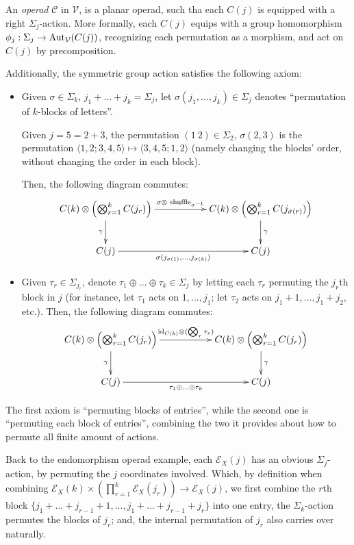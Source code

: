 \documentclass{article}
\begin{document}
\begin{defn}
    An \emph{operad} $\mathcal{C}$ in $\mathcal{V}$, is a planar operad, such tha each $C(j)$ is equipped with a right $\Sigma_j$-action. More formally, each $C(j)$ equips with a group homomorphism $\phi_j:\Sigma_j\rightarrow \mathrm{Aut}_\mathcal{V}(C(j))$, recognizing each permutation as a morphism, and act on $C(j)$ by precomposition.

    Additionally, the symmetric group action satisfies the following axiom:
    \begin{itemize}
        \item Given $\sigma\in\Sigma_k$, $j_1+...+j_k = \Sigma_j$, let $\sigma(j_1,...,j_k)\in\Sigma_j$ denotes ``permutation of $k$-blocks of letters''.
        \begin{exmp}
            Given $j=5=2+3$, the permutation $(1\ 2)\in \Sigma_2$, $\sigma(2,3)$ is the permutation $\langle 1,2;3,4,5 \rangle \mapsto \langle 3,4,5;1,2\rangle$ (namely changing the blocks' order, without changing the order in each block).
        \end{exmp} 
        Then, the following diagram commutes:
        \[\xymatrix{
            C(k)\tensor \left(\bigtensor_{r=1}^k C(j_r)\right) \ar[d]_-{\gamma} \ar[rr]^-{\sigma\tensor \text{ shuffle}_{\sigma^{-1}}} && C(k)\tensor \left(\bigtensor_{r=1}^k C(j_{\sigma(r)})\right) \ar[d]^-{\gamma}\\
            C(j) \ar[rr]_-{\sigma(j_{\sigma(1)},...,j_{\sigma(k)})} && C(j)
        }\]
        \item Given $\tau_r\in \Sigma_{j_r}$, denote $\tau_1\oplus ... \oplus \tau_k\in \Sigma_j$ by letting each $\tau_r$ permuting the $j_r$th block in $j$ (for instance, let $\tau_1$ acts on $1,...,j_1$; let $\tau_2$ acts on $j_1+1,...,j_1+j_2$, etc.). Then, the following diagram commutes:
        \[\xymatrix{
            C(k)\tensor \left(\bigtensor_{r=1}^k C(j_r)\right)\ar[d]_-{\gamma} \ar[rr]^-{\id_{C(k)}\tensor (\bigtensor_r \tau_r)} && C(k)\tensor \left(\bigtensor_{r=1}^k C(j_r)\right) \ar[d]^-{\gamma}\\
            C(j) \ar[rr]_{\tau_1\oplus...\oplus\tau_k} && C(j)
        }\]
    \end{itemize}
\end{defn}

The first axiom is ``permuting blocks of entries'', while the second one is ``permuting each block of entries'', combining the two it provides about how to permute all finite amount of actions.

\begin{exmp}
    Back to the endomorphism operad example, each $\mathcal{E}_X (j)$ has an obvious $\Sigma_j$-action, by permuting the $j$ coordinates involved. Which, by definition when combining $\mathcal{E}_X(k)\times \left(\prod_{r=1}^k \mathcal{E}_X (j_r)\right)\rightarrow \mathcal{E}_X (j)$, we first combine the $r$th block $\{j_1+...+j_{r-1}+1,...,j_1+...+j_{r-1}+j_r\}$ into one entry, the $\Sigma_k$-action permutes the blocks of $j_r$; and, the internal permutation of $j_r$ also carries over naturally.
\end{exmp}
\end{document}
